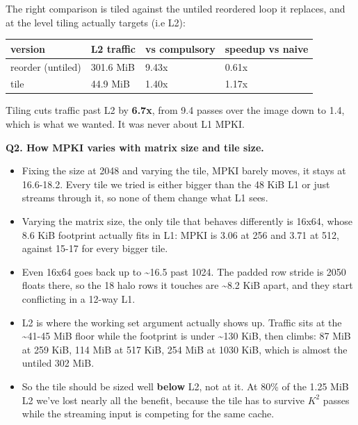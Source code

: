 \documentclass[
  10pt,
]{article}
\newcounter{none} %
\providecommand{\tightlist}{%
  \setlength{\itemsep}{0pt}\setlength{\parskip}{0pt}}
\begin{document}
The right comparison is tiled against the untiled reordered loop it
replaces, and at the level tiling actually targets (i.e L2):

{\def\LTcaptype{none} %
\begin{longtable}[]{@{}llll@{}}
\toprule\noalign{}
version & L2 traffic & vs compulsory & speedup vs naive \\
\midrule\noalign{}
\endhead
\bottomrule\noalign{}
\endlastfoot
reorder (untiled) & 301.6 MiB & 9.43x & 0.61x \\
tile & 44.9 MiB & 1.40x & 1.17x \\
\end{longtable}
}

Tiling cuts traffic past L2 by \textbf{6.7x}, from 9.4 passes over the
image down to 1.4, which is what we wanted. It was never about L1 MPKI.

\textbf{Q2. How MPKI varies with matrix size and tile size.}

\begin{itemize}
\tightlist
\item
  Fixing the size at 2048 and varying the tile, MPKI barely moves, it stays
  at 16.6-18.2. Every tile we tried is either bigger than the 48 KiB L1 or
  just streams through it, so none of them change what L1 sees.

\item
  Varying the matrix size, the only tile that behaves differently is 16x64,
  whose 8.6 KiB footprint actually fits in L1: MPKI is 3.06 at 256 and 3.71
  at 512, against 15-17 for every bigger tile.

\item
  Even 16x64 goes back up to \textasciitilde16.5 past 1024. The padded row
  stride is 2050 floats there, so the 18 halo rows it touches are
  \textasciitilde8.2 KiB apart, and they start conflicting in a 12-way L1.

\item
  L2 is where the working set argument actually shows up. Traffic sits at
  the \textasciitilde41-45 MiB floor while the footprint is under
  \textasciitilde130 KiB, then climbs: 87 MiB at 259 KiB, 114 MiB at 517
  KiB, 254 MiB at 1030 KiB, which is almost the untiled 302 MiB.

\item
  So the tile should be sized well \textbf{below} L2, not at it. At 80\% of
  the 1.25 MiB L2 we've lost nearly all the benefit, because the tile has to
  survive $K^2$ passes while the streaming input is competing for the same
  cache.
\end{itemize}
\end{document}
